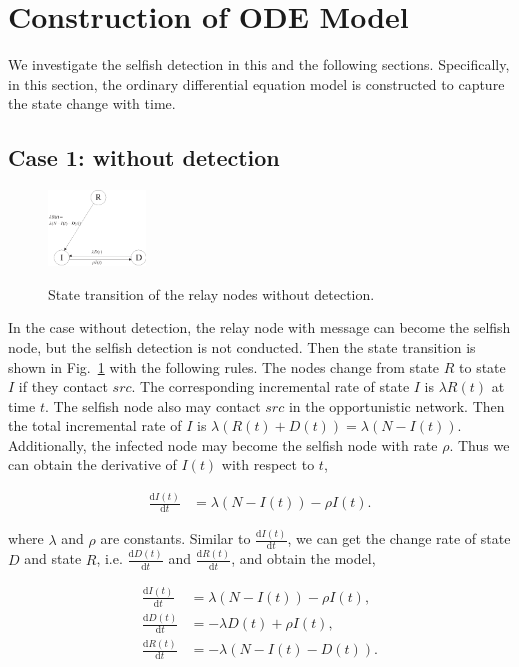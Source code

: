 \section{Construction of ODE Model}
\label{sec:wo_detect}
We investigate the selfish detection in this and the following sections.
Specifically, in this section, the ordinary differential equation model
is constructed to capture the state change with time.
\subsection{Case 1: without detection}
\label{subsec:wo_detc}
\begin{figure}
  \centering
  {\includegraphics[width=0.23\textwidth]
  {fig/state_transition_no_detect.eps}}
     \caption{State transition of the relay nodes without detection.}
     \label{fig:ss_wo_dt}
\end{figure}
In the case without detection,
the relay node with message can become the selfish node,
but the selfish detection is not conducted.
Then the state transition is shown
in Fig.~\ref{fig:ss_wo_dt} with the following rules.
The nodes change from state $R$ to state $I$ if they contact $src$.
The corresponding incremental rate of state $I$ is $\lambda R(t)$ at time $t$.
The selfish node also may contact $src$ in the opportunistic network.
Then the total incremental rate of $I$ is
$\lambda (R(t)+D(t))=\lambda (N-I(t))$.
Additionally, the infected node may become the selfish node with rate $\rho$.
Thus we can obtain the derivative of $I(t)$ with respect to $t$,
\begin{small}
\begin{equation}
\nonumber
\begin{aligned}
\frac{\mathrm{d} I(t)}{\mathrm{d} t} &= \lambda (N-I(t)) - \rho I(t).
\end{aligned}
\end{equation}
\end{small}
where $\lambda$ and $\rho$ are constants.
Similar to $\frac{\mathrm{d} I(t)}{\mathrm{d} t}$,
we can get the change rate of state $D$ and state $R$,
i.e. $\frac{\mathrm{d} D(t)}{\mathrm{d} t}$ and
$\frac{\mathrm{d} R(t)}{\mathrm{d} t}$,
and obtain the model,
\begin{small}
\begin{equation}
\label{eq:IDR_wo}
\begin{aligned}
\frac{\mathrm{d} I(t)}{\mathrm{d} t} &=  \lambda (N-I(t)) - \rho I(t),\\
\frac{\mathrm{d} D(t)}{\mathrm{d} t} &= - \lambda D(t) + \rho I(t),\\
\frac{\mathrm{d} R(t)}{\mathrm{d} t} &= - \lambda (N-I(t)-D(t)).
\end{aligned}
\end{equation}
\end{small}
